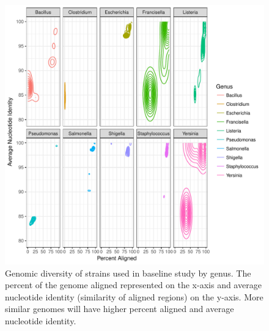 \documentclass[fleqn,10pt,lineno]{wlpeerj}\usepackage[]{graphicx}\usepackage[]{color}
\makeatletter
\def\maxwidth{ %
  \ifdim\Gin@nat@width>\linewidth
    \linewidth
  \else
    \Gin@nat@width
  \fi
}
\newenvironment{knitrout}{}{} %
\makeatother
\begin{document}
\begin{knitrout}
\color{fgcolor}\begin{figure}
\includegraphics[width=\maxwidth]{figure/baseline_ani-1} \caption[Genomic diversity of strains used in baseline study by genus]{Genomic diversity of strains used in baseline study by genus. The percent of the genome aligned represented on the x-axis and average nucleotide identity (similarity of aligned regions) on the y-axis. More similar genomes will have higher percent aligned and average nucleotide identity.}\label{fig:baseline_ani}
\end{figure}


\end{knitrout}
\end{document}
